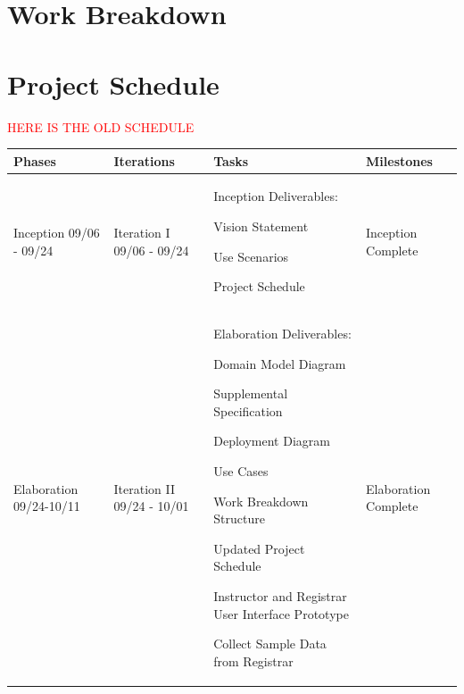 \documentclass[11pt]{article}
\newenvironment{packed_itemize}{
\begin{itemize}
  \setlength{\itemsep}{1pt}
  \setlength{\parskip}{0pt}
  \setlength{\parsep}{0pt}
}{\end{itemize}}
\begin{document}
\section{Work Breakdown} %




\section{Project Schedule}  %


\textcolor{red}{HERE IS THE OLD SCHEDULE}

\begin{tabular}{|m{0.9in}|m{0.9in}|m{4in}|m{.8in}|}
\hline
\textbf{Phases}  & \textbf{Iterations}  & \textbf{Tasks}        & \textbf{Milestones} \\
\hline\hline
Inception 09/06 - 09/24 &
Iteration I 09/06 - 09/24 & \vspace{0.1in}
Inception Deliverables:
	 \begin{packed_itemize}
	\vspace{-0.15in}
		\item Vision Statement
		\item Use Scenarios
		\item Project Schedule
	\vspace{-0.15in}
	\end{packed_itemize}
	& Inception Complete\\
\hline
Elaboration 09/24-10/11&
Iteration II 09/24 - 10/01&  \vspace{0.1in}
Elaboration Deliverables:
	 \begin{packed_itemize}
	\vspace{-0.15in}
		\item Domain Model Diagram
		\item Supplemental Specification
		\item Deployment Diagram
		\item Use Cases
		\item Work Breakdown Structure
		\item Updated Project Schedule
   \end{packed_itemize}

\raggedright{
Instructor and Registrar User Interface Prototype
}

Collect Sample Data from Registrar
& Elaboration Complete
\\
\hline


\end{tabular}
\end{document}
